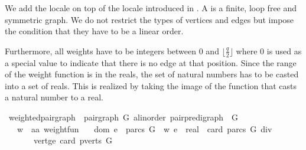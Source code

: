 \begin{isabellebody}
\isadelimproof
%
\endisadelimproof
%
\isatagproof
%
\endisatagproof
{\isafoldproof}%
%
\isadelimproof
%
\endisadelimproof
%
\isadelimdocument
%
\endisadelimdocument
%
\isatagdocument
%
\isamarkuptrue%
%
\endisatagdocument
{\isafolddocument}%
%
\isadelimdocument
%
\endisadelimdocument
%
\begin{isamarkuptext}%
\label{section:localeSurjective} We add the locale  
on top of the locale  introduced in . A   is a 
finite, loop free and symmetric graph. We do not restrict the types of vertices and edges but impose 
the condition that they have to be a linear order.

 Furthermore, all weights have to be integers between 0 and $\lfloor\frac{q}{2}\rfloor$ where 0 is 
used as a special value to indicate that there is no edge at that position. Since the 
range of the weight function is in the reals, the set of natural numbers
\mbox{} has to be casted into a set of reals. This is realized by taking the image
of the function  that casts a natural number to a real.%
\end{isamarkuptext}\isamarkuptrue%
\isamarkupfalse%
\ weighted{\isacharunderscore}pair{\isacharunderscore}graph\ {\isacharequal}\ pair{\isacharunderscore}graph\ {\isachardoublequoteopen}{\isacharparenleft}G{\isacharcolon}{\isacharcolon}\ {\isacharparenleft}{\isacharprime}a{\isacharcolon}{\isacharcolon}linorder{\isacharparenright}\ pair{\isacharunderscore}pre{\isacharunderscore}digraph{\isacharparenright}{\isachardoublequoteclose}\ \ G\ {\isacharplus}\isanewline
\ \ \ w\ {\isacharcolon}{\isacharcolon}\ {\isachardoublequoteopen}{\isacharparenleft}{\isacharprime}a{\isasymtimes}{\isacharprime}a{\isacharparenright}\ weight{\isacharunderscore}fun{\isachardoublequoteclose}\isanewline
\ \ \ dom{\isacharcolon}\ {\isachardoublequoteopen}e\ {\isasymin}\ parcs\ G\ {\isasymlongrightarrow}\ w\ e\ {\isasymin}\ real\ {\isacharbackquote}\ {\isacharbraceleft}{}{\isachardot}{\isachardot}card\ {\isacharparenleft}parcs\ G{\isacharparenright}\ div\ {}{\isacharbraceright}{\isachardoublequoteclose}\ \isanewline
\ \ \ \ \ \ \ vert{\isacharunderscore}ge{\isacharcolon}\ {\isachardoublequoteopen}card\ {\isacharparenleft}pverts\ G{\isacharparenright}\ {\isasymge}\ {}{\isachardoublequoteclose}%

\end{isabellebody}
